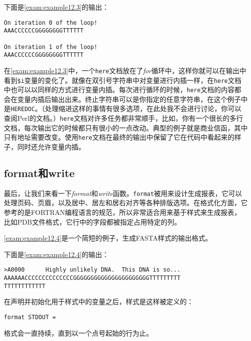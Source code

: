 下面是\autoref{exam:example12.3}的输出：

\begin{lstlisting}
On iteration 0 of the loop!
AAACCCCCCGGGGGGGGTTTTTT

On iteration 1 of the loop!
AAACCCCCCGGGGGGGGTTTTTT
\end{lstlisting}

在\autoref{exam:example12.3}中，一个\verb|here|文档放在了\textit{for}循环中，这样你就可以在输出中看到\verb|$i|变量的变化了。就像在双引号字符串中对变量进行内插一样，在\verb|here|文档中也可以以同样的方式进行变量内插。每次进行循环的时候，\verb|here|文档的内容都会在变量内插后输出出来。终止字符串可以是你指定的任意字符串，在这个例子中是\verb|HEREDOC|。（处理缩进这样的事情有很多选项，在此处我不会进行讨论，你可以查阅Perl的文档。）\verb|here|文档对许多任务都非常顺手，比如，你有一个很长的多行文档，每次输出它的时候都只有很小的一点改动。典型的例子就是商业信函，其中只有地址需要改变。使用\verb|here|文档在最终的输出中保留了它在代码中看起来的样子，同时还允许变量内插。

\subsection{format和write}
最后，让我们来看一下\textit{format}和\textit{write}函数。\verb|format|被用来设计生成报表，它可以处理页码、页眉，以及居中、居左和居右对齐等各种排版选项。在格式化方面，它参考的是FORTRAN编程语言的规范，所以非常适合用来基于样式来生成报表，比如PDB文件格式，它行中的字段都被指定占用特定的列。

\autoref{exam:example12.4}是一个简短的例子，生成FASTA样式的输出格式。



下面是\autoref{exam:example12.4}的输出：

\begin{lstlisting}
>A0000      Highly unlikely DNA.  This DNA is so...
AAAAAACCCCCCCCCCCCCCGGGGGGGGGGGGGGGGGGGGGGTTTTTTTTT
TTTTTTTTTTTT
\end{lstlisting}

在声明并初始化用于样式中的变量之后，样式是这样被定义的：

\begin{lstlisting}
format STDOUT =
\end{lstlisting}

格式会一直持续，直到以一个点号起始的行为止。

